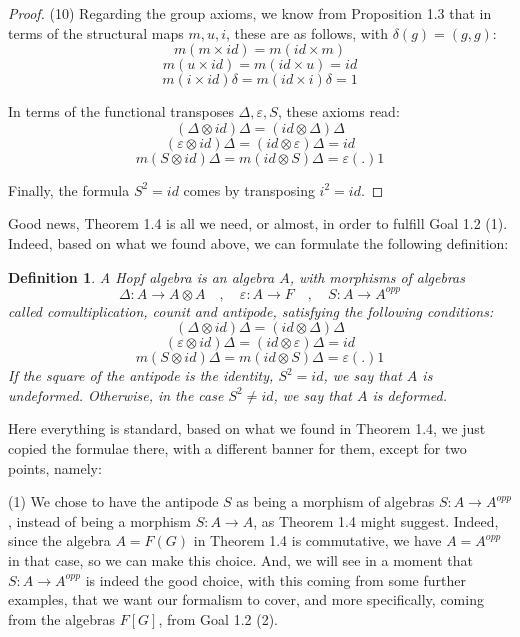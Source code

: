 \documentclass[12pt]{amsbook}
\newtheorem{definition}[theorem]{Definition}
\begin{document}
\begin{proof}
(10) Regarding the group axioms, we know from Proposition 1.3 that in terms of the structural maps $m,u,i$, these are as follows, with $\delta(g)=(g,g)$:
$$m(m\times id)=m(id\times m)$$
$$m(u\times id)=m(id\times u)=id$$
$$m(i\times id)\delta=m(id\times i)\delta=1$$

In terms of the functional transposes $\Delta,\varepsilon,S$, these axioms read: 
$$(\Delta\otimes id)\Delta=(id\otimes \Delta)\Delta$$
$$(\varepsilon\otimes id)\Delta=(id\otimes\varepsilon)\Delta=id$$
$$m(S\otimes id)\Delta=m(id\otimes S)\Delta=\varepsilon(.)1$$

Finally, the formula $S^2=id$ comes by transposing $i^2=id$.
\end{proof}

Good news, Theorem 1.4 is all we need, or almost, in order to fulfill Goal 1.2 (1). Indeed, based on what we found above, we can formulate the following definition:


\begin{definition}
A Hopf algebra is an algebra $A$, with morphisms of algebras
$$\Delta:A\to A\otimes A\quad,\quad 
\varepsilon:A\to F\quad,\quad 
S:A\to A^{opp}$$
called comultiplication, counit and antipode, satisfying the following conditions:
$$(\Delta\otimes id)\Delta=(id\otimes \Delta)\Delta$$
$$(\varepsilon\otimes id)\Delta=(id\otimes\varepsilon)\Delta=id$$
$$m(S\otimes id)\Delta=m(id\otimes S)\Delta=\varepsilon(.)1$$
If the square of the antipode is the identity, $S^2=id$, we say that $A$ is undeformed. Otherwise, in the case $S^2\neq id$, we say that $A$ is deformed.
\end{definition}

Here everything is standard, based on what we found in Theorem 1.4, we just copied the formulae there, with a different banner for them, except for two points, namely:

\bigskip

(1) We chose to have the antipode $S$ as being a morphism of algebras $S:A\to A^{opp}$, instead of being a morphism $S:A\to A$, as Theorem 1.4 might suggest. Indeed, since the algebra $A=F(G)$ in Theorem 1.4 is commutative, we have $A=A^{opp}$ in that case, so we can make this choice. And, we will see in a moment that $S:A\to A^{opp}$ is indeed the good choice, with this coming from some further examples, that we want our formalism to cover, and more specifically, coming from the algebras $F[G]$, from Goal 1.2 (2).
\end{document}
